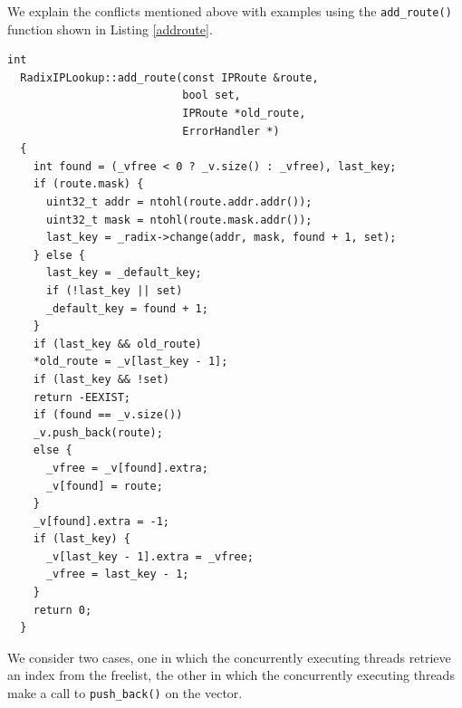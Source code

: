 \documentclass[a4paper,marginparwidth=50pt,marginparsep=10pt]{article}
\begin{document}
We explain the conflicts mentioned above with examples using the \verb+add_route()+ function shown in  Listing \ref{addroute}.
\begin{lstlisting}[caption = The add\_route function, label=addroute,float=tph]
  int
  RadixIPLookup::add_route(const IPRoute &route, 
                           bool set, 
                           IPRoute *old_route, 
                           ErrorHandler *)
  {
    int found = (_vfree < 0 ? _v.size() : _vfree), last_key;
    if (route.mask) {
      uint32_t addr = ntohl(route.addr.addr());
      uint32_t mask = ntohl(route.mask.addr());
      last_key = _radix->change(addr, mask, found + 1, set);
    } else {
      last_key = _default_key;
      if (!last_key || set)
      _default_key = found + 1;
    }
    if (last_key && old_route)
    *old_route = _v[last_key - 1];
    if (last_key && !set)
    return -EEXIST;
    if (found == _v.size())
    _v.push_back(route);
    else {
      _vfree = _v[found].extra;
      _v[found] = route;
    }
    _v[found].extra = -1;
    if (last_key) {
      _v[last_key - 1].extra = _vfree;
      _vfree = last_key - 1;
    }
    return 0;
  }
\end{lstlisting}
We consider two cases, one in which the concurrently executing threads retrieve an index from the freelist, the other in which the concurrently executing threads make a call to \verb+push_back()+ on the vector.
\end{document}
